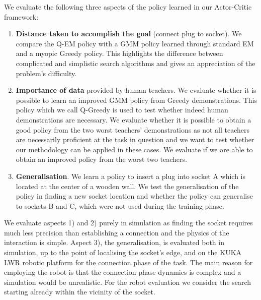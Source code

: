 We evaluate the following three aspects of the policy learned in our Actor-Critic framework:
\begin{enumerate}
 \item \textbf{Distance taken to accomplish the goal} (connect plug to socket). We compare the Q-EM policy with 
 a GMM policy learned through standard EM and a myopic Greedy policy. This highlights the difference between complicated and simplistic  
  search algorithms and gives an appreciation of the problem's difficulty.
 \item \textbf{Importance of data} provided by human teachers. We evaluate whether it is possible to learn 
 an improved GMM policy from Greedy demonstrations. This policy which we call Q-Greedy is used to test whether 
 indeed human demonstrations are necessary.
 We evaluate whether it is possible to obtain a good policy from the two worst teachers' demonstrations as not all teachers 
 are necessarily proficient at the task in question and we want to test whether our methodology can be applied in these
 cases. We evaluate if we  are able to obtain an improved policy from the worst two teachers.
 \item \textbf{Generalisation}. We learn a policy to insert a plug into socket A which is located at the center of a wooden 
 wall. We test the generalisation of the policy in finding a new socket location and whether the policy can generalise to sockets 
 B and C, which were not used during the training phase.
\end{enumerate}

We evaluate aspects 1) and 2) purely in simulation as finding the socket requires much less precision than establishing a 
connection and the physics of the interaction is simple. Aspect 3), the generalisation, is evaluated both in simulation,
up to the point of localising the socket's edge, and on the KUKA LWR robotic platform
for the connection phase of the task. The main reason for employing the robot is that the connection phase dynamics is 
complex and a simulation would be unrealistic. For the robot evaluation we consider 
the search starting already within the vicinity of the socket.



